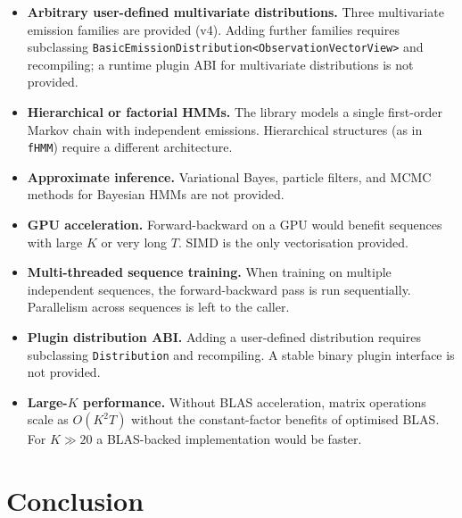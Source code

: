 \documentclass[11pt]{article}
\begin{document}
\begin{itemize}
  \item \textbf{Arbitrary user-defined multivariate distributions.}
        Three multivariate emission families are provided (v4).
        Adding further families requires subclassing
        \texttt{BasicEmissionDistribution<}\texttt{ObservationVectorView>}
        and recompiling; a runtime plugin ABI for multivariate distributions
        is not provided.

  \item \textbf{Hierarchical or factorial HMMs.}
        The library models a single first-order Markov chain with
        independent emissions.
        Hierarchical structures (as in \texttt{fHMM}) require a
        different architecture.

  \item \textbf{Approximate inference.}
        Variational Bayes, particle filters, and MCMC methods for
        Bayesian HMMs are not provided.

  \item \textbf{GPU acceleration.}
        Forward-backward on a GPU would benefit sequences with large
        $K$ or very long $T$.
        SIMD is the only vectorisation provided.

  \item \textbf{Multi-threaded sequence training.}
        When training on multiple independent sequences, the
        forward-backward pass is run sequentially.
        Parallelism across sequences is left to the caller.

  \item \textbf{Plugin distribution ABI.}
        Adding a user-defined distribution requires subclassing
        \texttt{Distribution} and recompiling.
        A stable binary plugin interface is not provided.

  \item \textbf{Large-$K$ performance.}
        Without BLAS acceleration, matrix operations scale as $O(K^2 T)$
        without the constant-factor benefits of optimised BLAS.
        For $K \gg 20$ a BLAS-backed implementation would be faster.
\end{itemize}

\section{Conclusion}
\label{sec:conclusion}
\end{document}

